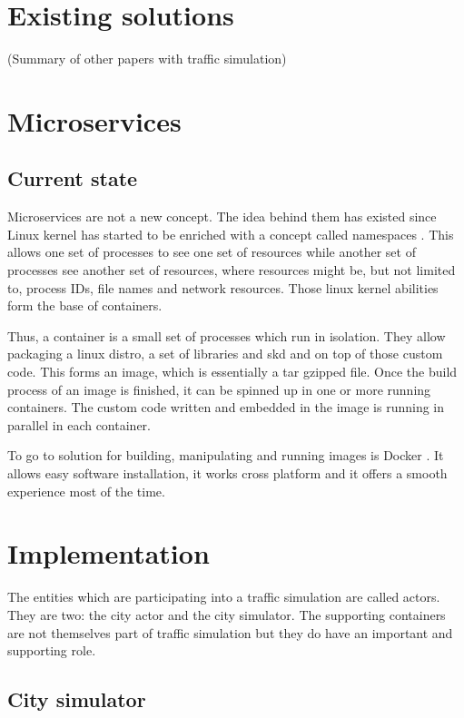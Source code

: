 \documentclass[conference]{IEEEtran}
\begin{document}
\section{Existing solutions}

(Summary of other papers with traffic simulation)

\section{Microservices}

\subsection{Current state}

Microservices are not a new concept. The idea behind them has existed since Linux kernel has started to be enriched with a concept called namespaces \cite{wiki:linuxns}. This allows one set of processes to see one set of resources while another set of processes see another set of resources, where resources might be, but not limited to, process IDs, file names and network resources. Those linux kernel abilities form the base of containers.

Thus, a container is a small set of processes which run in isolation. They allow packaging a linux distro, a set of libraries and skd and on top of those custom code. This forms an image, which is essentially a tar gzipped file. Once the build process of an image is finished, it can be spinned up in one or more running containers. The custom code written and embedded in the image is running in parallel in each container.

To go to solution for building, manipulating and running images is Docker \cite{docker}. It allows easy software installation, it works cross platform and it offers a smooth experience most of the time.

\section{Implementation}

The entities which are participating into a traffic simulation are called actors. They are two: the city actor and the city simulator. The supporting containers are not themselves part of traffic simulation but they do have an important and supporting role.

\subsection{City simulator}
\end{document}
